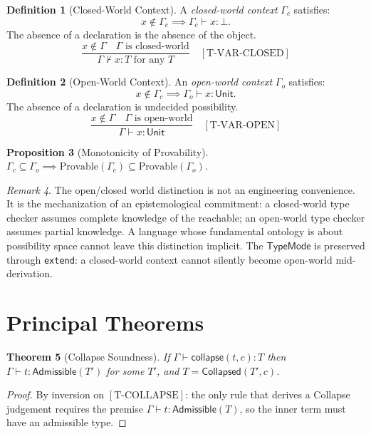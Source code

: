 \documentclass[12pt, a4paper, openany]{book}
\theoremstyle{plain}
\newtheorem{theorem}{Theorem}[chapter]
\newtheorem{proposition}[theorem]{Proposition}
\theoremstyle{definition}
\newtheorem{definition}[theorem]{Definition}
\theoremstyle{remark}
\newtheorem{remark}[theorem]{Remark}
\newcommand{\Adm}{\mathsf{Admissible}}
\newcommand{\Col}{\mathsf{Collapsed}}
\begin{document}
\begin{definition}[Closed-World Context]
A \emph{closed-world context} $\Gamma_c$ satisfies:
\[
x \notin \Gamma_c \implies \Gamma_c \vdash x : \bot.
\]
The absence of a declaration is the absence of the object.
\[
\frac{x \notin \Gamma \quad \Gamma \text{ is closed-world}}{\Gamma \not\vdash x : T \text{ for any } T} \quad [\mathrm{T\text{-}VAR\text{-}CLOSED}]
\]
\end{definition}

\begin{definition}[Open-World Context]
An \emph{open-world context} $\Gamma_o$ satisfies:
\[
x \notin \Gamma_c \implies \Gamma_o \vdash x : \mathsf{Unit}.
\]
The absence of a declaration is undecided possibility.
\[
\frac{x \notin \Gamma \quad \Gamma \text{ is open-world}}{\Gamma \vdash x : \mathsf{Unit}} \quad [\mathrm{T\text{-}VAR\text{-}OPEN}]
\]
\end{definition}

\begin{proposition}[Monotonicity of Provability]
$\Gamma_c \subseteq \Gamma_o \implies \mathrm{Provable}(\Gamma_c) \subseteq
\mathrm{Provable}(\Gamma_o)$.
\end{proposition}

\begin{remark}
The open/closed world distinction is not an engineering convenience. It is the
mechanization of an epistemological commitment: a closed-world type checker assumes
complete knowledge of the reachable; an open-world type checker assumes partial
knowledge. A language whose fundamental ontology is about possibility space cannot
leave this distinction implicit. The $\mathsf{TypeMode}$ is preserved through
\texttt{extend}: a closed-world context cannot silently become open-world
mid-derivation.
\end{remark}

\section{Principal Theorems}

\begin{theorem}[Collapse Soundness]
If $\Gamma \vdash \mathsf{collapse}(t, c) : T$ then $\Gamma \vdash t : \Adm(T')$
for some $T'$, and $T = \Col(T', c)$.
\end{theorem}

\begin{proof}
By inversion on $[\mathrm{T\text{-}COLLAPSE}]$: the only rule that derives a
Collapse judgement requires the premise $\Gamma \vdash t : \Adm(T)$, so the
inner term must have an admissible type.
\end{proof}
\end{document}
